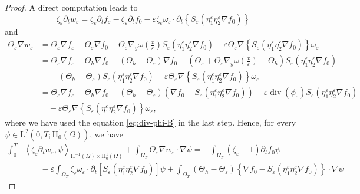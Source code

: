 \documentclass[preprint, 12pt]{amsart}
\numberwithin{equation}{section}
\numberwithin{equation}{section}
\newcommand{\eps}{\varepsilon}
\DeclareMathOperator{\dv}{div}
\begin{document}
\begin{proof}
A direct computation leads to
\[
\zeta_\eps\partial_{t}w_{\varepsilon}
= \zeta_\eps \partial_t f_\eps 
- \zeta_\eps \partial_t f_0 
- \eps \zeta_\eps \omega_\eps\cdot \partial_t \left\{S_\eps \left( \eta_1^\eps \eta_2^\eps \nabla f_0 \right)\right\}
\]
and
\begin{equation*}
\begin{aligned}
\Theta_\eps \nabla w_\eps 
& = \Theta_\eps \nabla f_\eps
- \Theta_\eps \nabla f_0
- \Theta_\eps \nabla_y \omega\left(\frac{x}{\eps}\right) S_\eps \left( \eta_1^\eps \eta_2^\eps \nabla f_0 \right)
- \eps \Theta_\eps \nabla \left\{S_\eps \left( \eta_1^\eps \eta_2^\eps \nabla f_0 \right)\right\} \omega_\eps
\\
& = \Theta_\eps \nabla f_\eps
- \Theta_h \nabla f_0 
+ \left(\Theta_h - \Theta_\eps\right) \nabla f_0
- \left( \Theta_\eps + \Theta_\eps \nabla_y \omega\left(\frac{x}{\eps}\right) - \Theta_h\right) S_\eps \left( \eta_1^\eps \eta_2^\eps \nabla f_0 \right)
\\
& \quad - \left(\Theta_h - \Theta_\eps\right) S_\eps \left( \eta_1^\eps \eta_2^\eps \nabla f_0 \right)
- \eps \Theta_\eps \nabla \left\{S_\eps \left( \eta_1^\eps \eta_2^\eps \nabla f_0 \right)\right\} \omega_\eps
\\
& = \Theta_\eps \nabla f_\eps
- \Theta_h \nabla f_0 
+ \left(\Theta_h - \Theta_\eps\right) \left( \nabla f_0 - S_\eps \left( \eta_1^\eps \eta_2^\eps \nabla f_0 \right) \right)
- \eps \dv \left( \phi_\eps \right) S_\eps \left( \eta_1^\eps \eta_2^\eps \nabla f_0 \right) 
\\
& \quad 
- \eps \Theta_\eps \nabla \left\{S_\eps \left( \eta_1^\eps \eta_2^\eps \nabla f_0 \right)\right\} \omega_\eps,
\end{aligned}
\end{equation*}
where we have used the equation \eqref{eq:div-phi-B} in the last step. Hence, for every $\psi\in\mathrm L^2(0,T;\mathrm H^1_0(\Omega))$, we have
\begin{equation}\label{eq:wkform-1}
\begin{aligned}
\int_0^T & \left\langle \zeta_\eps\partial_{t}w_{\varepsilon},\psi \right\rangle_{\mathrm{H}^{-1}(\Omega) \times \mathrm{H}_0^1(\Omega)} 
+ \int_{\Omega_T} \Theta_\eps\nabla w_{\varepsilon} \cdot \nabla \psi 
= - \int_{\Omega_T} (\zeta_\eps -1)\partial_{t}f_{0}\psi  
\\
& \qquad - \eps \int_{\Omega_T} \zeta_\eps \omega_\eps \cdot \partial_t \left[S_\eps (\eta_1^\eps \eta_2^\eps \nabla f_0)\right] \psi 
+\int_{\Omega_T}\left(\Theta_h - \Theta_\eps\right) \left\{\nabla f_0 - S_\eps(\eta_1^\eps\eta_2^\eps \nabla f_0)\right\} \cdot \nabla \psi

\end{aligned}
\end{equation}
\end{proof}
\end{document}
